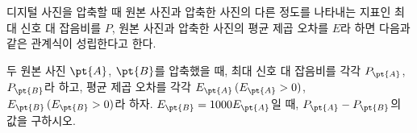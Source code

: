 디지털 사진을 압축할 때 원본 사진과 압축한 사진의 다른 정도를 나타내는 지표인 최대 신호 대 잡음비를 $P$, 원본 사진과 압축한 사진의 평균 제곱 오차를 $E$라 하면 다음과 같은 관계식이 성립한다고 한다.\par\smallskip{}\par\smallskip\noindent 두 원본 사진 $\pt{A}$, $\pt{B}$를 압축했을 때, 최대 신호 대 잡음비를 각각 $P_{\pt{A}}$, $P_{\pt{B}}$라 하고, 평균 제곱 오차를 각각 $E_{\pt{A}}\mkern3mu (E_{\pt{A}}>0)$, $E_{\pt{B}}\mkern3mu (E_{\pt{B}}>0)$라 하자. $E_{\pt{B}}=1000E_{\pt{A}}$일 때, $P_{\pt{A}}-P_{\pt{B}}$의 값을 구하시오.
